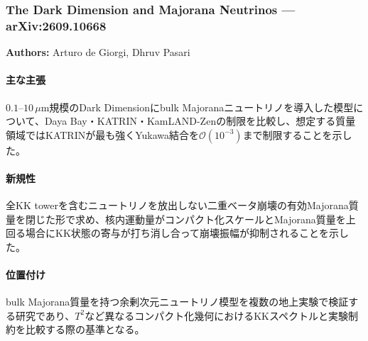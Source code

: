 \subsubsection{The Dark Dimension and Majorana Neutrinos --- arXiv:2609.10668}

\textbf{Authors:} Arturo de Giorgi, Dhruv Pasari

\paragraph{主な主張}
$0.1$--$10\,\mu\mathrm{m}$規模のDark Dimensionにbulk Majoranaニュートリノを導入した模型について、Daya Bay・KATRIN・KamLAND-Zenの制限を比較し、想定する質量領域ではKATRINが最も強くYukawa結合を$\mathcal{O}(10^{-3})$まで制限することを示した\cite{deGiorgi:2026DarkDimensionMajorana}。

\paragraph{新規性}
全KK towerを含むニュートリノを放出しない二重ベータ崩壊の有効Majorana質量を閉じた形で求め、核内運動量がコンパクト化スケールとMajorana質量を上回る場合にKK状態の寄与が打ち消し合って崩壊振幅が抑制されることを示した。

\paragraph{位置付け}
bulk Majorana質量を持つ余剰次元ニュートリノ模型を複数の地上実験で検証する研究であり、$T^2$など異なるコンパクト化幾何におけるKKスペクトルと実験制約を比較する際の基準となる。

